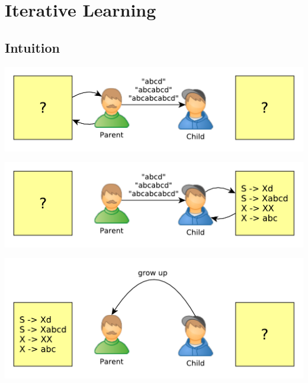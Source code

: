 \documentclass[11pt,a4paper,xcolor=dvipsnames]{beamer}
\begin{document}
\section{Iterative Learning}
\subsection{Intuition}
\begin{frame}
  \begin{center}
    \includegraphics[scale=0.6]{assets/iterative1.pdf}
  \end{center}
\end{frame}

\begin{frame}
  \begin{center}
    \includegraphics[scale=0.6]{assets/iterative2.pdf}
  \end{center}
\end{frame}

\begin{frame}
  \begin{center}
    \includegraphics[scale=0.6]{assets/iterative3.pdf}
  \end{center}
\end{frame}
\end{document}
